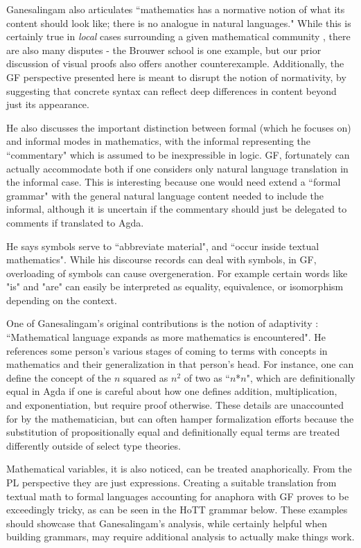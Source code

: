 Ganesalingam also articulates ``mathematics has a normative notion of what its
content should look like; there is no analogue in natural languages." While this
is certainly true in \emph{local} cases surrounding a given mathematical
community , there are also many disputes - the Brouwer school is one example,
but our prior discussion of visual proofs also offers another counterexample.
Additionally, the GF perspective presented here is meant to disrupt the
notion of normativity, by suggesting that concrete syntax can reflect deep
differences in content beyond just its appearance.

He also discusses the important distinction between formal (which he focuses on)
and informal modes in mathematics, with the informal representing the
``commentary" which is assumed to be inexpressible in logic. GF, fortunately can
actually accommodate both if one considers only natural language translation in
the informal case. This is interesting because one would need extend a ``formal
grammar" with the general natural language content needed to include the
informal, although it is uncertain if the commentary should just be delegated to
comments if translated to Agda.

He says symbols serve to ``abbreviate material", and ``occur inside textual
mathematics". While his discourse records can deal with symbols, in GF,
overloading of symbols can cause overgeneration. For example certain words like
"is" and "are" can easily be interpreted as equality, equivalence, or
isomorphism depending on the context.

One of Ganesalingam's original contributions is the notion of adaptivity :
``Mathematical language expands as more mathematics is encountered". He
references some person's various stages of coming to terms with concepts in
mathematics and their generalization in that person's head. For instance, one
can define the concept of the $n$ squared as $n^2$ of two as ``$n$*$n$", which
are definitionally equal in Agda if one is careful about how one defines
addition, multiplication, and exponentiation, but require proof otherwise.
These details are unaccounted for by the mathematician, but can often hamper
formalization efforts because the substitution of propositionally equal and
definitionally equal terms are treated differently outside of select type theories.

Mathematical variables, it is also noticed, can be treated anaphorically. From
the PL perspective they are just expressions. Creating a suitable translation
from textual math to formal languages accounting for anaphora with GF proves to
be exceedingly tricky, as can be seen in the HoTT grammar below. These examples
should showcase that Ganesalingam's analysis, while certainly helpful when
building grammars, may require additional analysis to actually make things work.

